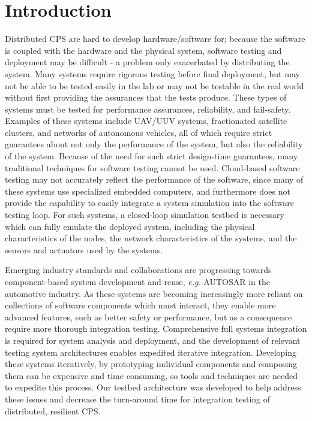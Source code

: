 \section{Introduction}

Distributed CPS are hard to develop hardware/software for; because the software is coupled with the hardware and the physical system, software testing and deployment may be difficult - a problem only exacerbated by distributing the system.  Many systems require rigorous testing before final deployment, but may not be able to be tested easily in the lab or may not be testable in the real world without first providing the assurances that the tests produce.  These types of systems must be tested for performance assurances, reliability, and fail-safety.  Examples of these systems include UAV/UUV systems, fractionated satellite clusters, and networks of autonomous vehicles, all of which require strict guarantees about not only the performance of the system, but also the reliability of the system.  Because of the need for such strict design-time guarantees, many traditional techniques for software testing cannot be used.  Cloud-based software testing may not accurately reflect the performance of the software, since many of these systems use specialized embedded computers, and furthermore does not provide the capability to easily integrate a system simulation into the software testing loop.  For such systems, a closed-loop simulation testbed is necessary which can fully emulate the deployed system, including the physical characteristics of the nodes, the network characteristics of the systems, and the sensors and actuators used by the systems.

Emerging industry standards and collaborations are progressing towards component-based system development and reuse, \emph{e.g.} AUTOSAR\cite{autosar} in the automotive industry.  As these systems are becoming increasingly more reliant on collections of software components which must interact, they enable more advanced features, such as better safety or performance, but as a consequence require more thorough integration testing.  Comprehensive full systems integration is required for system analysis and deployment, and the development of relevant testing system architectures enables expedited iterative integration.  Developing these systems iteratively, by prototyping individual components and composing them can be expensive and time consuming, so tools and techniques are needed to expedite this process.  Our testbed architecture was developed to help address these issues and decrease the turn-around time for integration testing of distributed, resilient CPS.  

